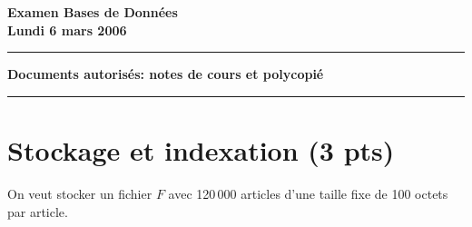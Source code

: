 \documentclass[french]{article}
\begin{document}
\begin{center}
\Large\bf  Examen Bases de Données\\
\large\bf Lundi 6 mars 2006
\end{center}


\vspace*{0.5cm}

\hrule

\textbf{Documents autorisés: notes de cours et polycopié}

\smallskip

\hrule

\section{Stockage et indexation (3 pts)}

On veut stocker un fichier $F$ avec 120\,000 articles d'une taille fixe de 
100 octets par article.
\end{document}
